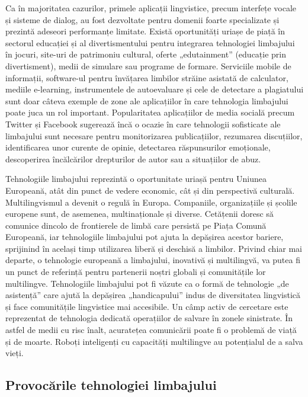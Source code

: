 \begin{multicols}{2}
Ca în majoritatea cazurilor, primele aplicații lingvistice, precum interfețe vocale și sisteme de dialog, au fost dezvoltate pentru domenii foarte specializate și prezintă adeseori performanțe limitate. Există oportunități uriașe de piață în sectorul educației și al divertismentului pentru integrarea tehnologiei limbajului în jocuri, \mbox{site-uri} de patrimoniu cultural, oferte „edutainment” (educație prin divertisment), medii de simulare sau programe de formare. Serviciile mobile de informații, \mbox{software-ul} pentru învățarea limbilor străine asistată de calculator, mediile e-learning, instrumentele de autoevaluare și cele de detectare a plagiatului sunt doar câteva exemple de zone ale aplicațiilor în care tehnologia limbajului poate juca un rol important. Popularitatea aplicațiilor de media socială precum Twitter și Facebook sugerează încă o ocazie în care tehnologii sofisticate ale limbajului sunt necesare pentru monitorizarea publicațiilor, rezumarea discuțiilor, identificarea unor curente de opinie, detectarea răspunsurilor emoționale, descoperirea încălcărilor drepturilor de autor sau a situațiilor de abuz.


Tehnologiile limbajului reprezintă o oportunitate uriașă pentru Uniunea Europeană, atât din punct de vedere economic, cât și din perspectivă culturală. Multilingvismul a devenit o regulă în Europa. Companiile, organizațiile și școlile europene sunt, de asemenea, multinaționale și diverse. Cetățenii doresc să comunice dincolo de frontierele de limbă care persistă pe Piața Comună Europeană, iar tehnologiile limbajului pot ajuta la depășirea acestor bariere, sprijinind în același timp utilizarea liberă și deschisă a limbilor. Privind chiar mai departe, o tehnologie europeană a limbajului, inovativă și multilingvă, va putea fi un punct de referință pentru partenerii noștri globali și comunitățile lor multilingve. Tehnologiile limbajului pot fi văzute ca o formă de tehnologie „de asistență” care ajută la depășirea „handicapului” indus de diversitatea lingvistică și face comunitățile lingvistice mai accesibile.
Un câmp activ de cercetare este reprezentat de tehnologia dedicată operațiilor de salvare în zonele sinistrate. În astfel de medii cu risc înalt, acuratețea comunicării poate fi o problemă de viață și de moarte. Roboți inteligenți cu capacități multilingve au potențialul de a salva vieți.

\subsection{Provocările tehnologiei limbajului}


\end{multicols}
